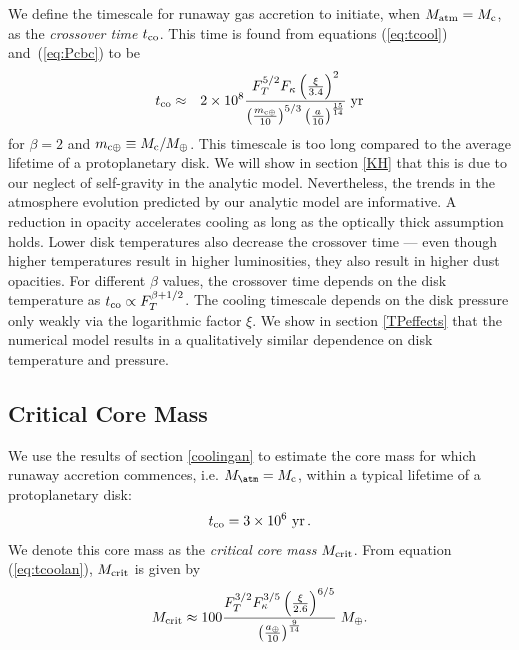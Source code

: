 \documentclass[apj]{emulateapj}
\newcommand{\yr}{\; {\rm yr}}
\newcommand{\Eqs}[2]{equations (\ref{#1}) and~(\ref{#2})}
\newcommand{\co}{_{\rm c}}
\newcommand{\mc}{m_{\rm c \oplus}}
\newcommand{\au}{a_\oplus}
\begin{document}
We define the timescale for runaway gas accretion to initiate, when $M_{\rm{atm}}=M_{\rm c}$, as the \textit{crossover time} $t_{\rm{co}}$. This time is found from \Eqs{eq:tcool}{eq:Pcbc} to be
\begin{eqnarray} 
\label{eq:tcoolan}
t_{\rm co} &\approx & 2 \times 10^8 {F_T^{5/2}  F_\kappa \left(\xi \over 3.4\right)^2  \over \left(\mc \over 10 \right)^{5/3} \left(a\over 10\right)^{15 \over 14}} \yr
\end{eqnarray} 
for $\beta = 2$ and $\mc \equiv M_{\rm c} / M_{\oplus}$.  
This timescale is too long compared to the average lifetime of a protoplanetary disk. We will show in section \ref{KH} that this is due to our neglect of self-gravity in the analytic model.  Nevertheless, the trends in the atmosphere evolution predicted by our analytic model are informative.  A reduction in opacity accelerates cooling as long as the optically thick assumption holds.  Lower disk temperatures also decrease the crossover time --- even though higher temperatures result in higher luminosities, they also result in higher dust opacities.   For different $\beta$ values, the crossover time depends on the disk temperature as $t_{\rm co} \propto F_T^{ \beta + 1/2}$.  The cooling timescale depends on the disk pressure only weakly via the  logarithmic factor $\xi$.  We show in section \ref{TPeffects} that the numerical model results in a qualitatively similar dependence on disk temperature and pressure.  %



\subsection{Critical Core Mass}\label{sec:critmass}

We use the results of section \ref{coolingan} to estimate the core mass for which  runaway accretion commences, i.e. $M_{\atm}=M\co$, within a typical lifetime of a protoplanetary disk: 
\begin{equation}
t_{\rm co} = 3 \times 10^6 ~{\rm yr} \,.
\end{equation} 
We denote this core mass as the \textit{critical core mass} $M_{\rm crit}$. From equation (\ref{eq:tcoolan}), $M_{\rm{crit}}$ is given by
\begin{equation}\label{eq:Mcrit}
M_{\rm crit} \approx 100 {F_T^{3/2} F_\kappa^{3/5}   \left(\xi \over 2.6 \right)^{6/5} \over \left(\au \over 10\right)^{9 \over 14}} \; M_\oplus.
\end{equation} 
\end{document}
